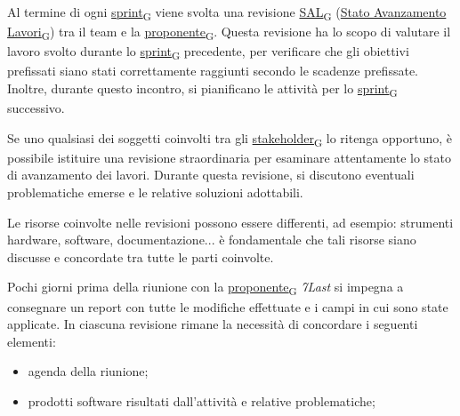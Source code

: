 Al termine di ogni \href{https://7last.github.io/docs/pb/documentazione-interna/glossario\#sprint}{sprint\textsubscript{G}} viene svolta una revisione \href{https://7last.github.io/docs/pb/documentazione-interna/glossario\#stato-avanzamento-lavori}{SAL\textsubscript{G}}
(\href{https://7last.github.io/docs/pb/documentazione-interna/glossario\#stato-avanzamento-lavori}{Stato Avanzamento Lavori\textsubscript{G}}) tra il team e la \href{https://7last.github.io/docs/pb/documentazione-interna/glossario\#proponente}{proponente\textsubscript{G}}. Questa revisione ha lo scopo di valutare il lavoro svolto durante lo \href{https://7last.github.io/docs/pb/documentazione-interna/glossario\#sprint}{sprint\textsubscript{G}} precedente, per verificare che gli obiettivi prefissati siano stati correttamente raggiunti secondo le scadenze prefissate.
Inoltre, durante questo incontro, si pianificano le attività per lo \href{https://7last.github.io/docs/pb/documentazione-interna/glossario\#sprint}{sprint\textsubscript{G}} successivo.

Se uno qualsiasi dei soggetti coinvolti tra gli \href{https://7last.github.io/docs/pb/documentazione-interna/glossario\#stakeholder}{stakeholder\textsubscript{G}} lo ritenga opportuno, è possibile istituire una revisione straordinaria per esaminare attentamente lo stato di avanzamento dei lavori. Durante questa revisione, si discutono eventuali problematiche emerse e le relative soluzioni adottabili.

Le risorse coinvolte nelle revisioni possono essere differenti, ad esempio: strumenti hardware, software, documentazione... è fondamentale che tali risorse siano discusse e concordate tra tutte le parti coinvolte.

Pochi giorni prima della riunione con la \href{https://7last.github.io/docs/pb/documentazione-interna/glossario\#proponente}{proponente\textsubscript{G}} \textit{7Last} si impegna a consegnare un report con tutte le modifiche effettuate e i campi in cui sono state applicate.
In ciascuna revisione rimane la necessità di concordare i seguenti elementi:
\begin{itemize}
	\item agenda della riunione;
	\item prodotti software risultati dall'attività e relative problematiche;
\end{itemize}

